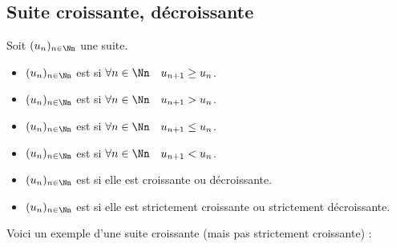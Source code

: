 \documentclass[class=report,crop=false]{standalone}
\begin{document}
\subsection{Suite croissante, décroissante}
\begin{definition}
Soit $(u_n)_{n\in \Nn}$ une suite.
\begin{itemize}
  \item $(u_n)_{n\in \Nn}$ est  si \quad $\forall n\in \Nn \quad u_{n+1} \ge u_n $.
  \item $(u_n)_{n\in \Nn}$ est  si \quad $\forall n\in \Nn \quad u_{n+1} > u_n$.
  \item $(u_n)_{n\in \Nn}$ est  si \quad $\forall n\in \Nn \quad u_{n+1} \le u_n$.
  \item $(u_n)_{n\in \Nn}$ est  si \quad $\forall n\in \Nn \quad u_{n+1} < u_n$.
    \item $(u_n)_{n\in \Nn}$ est  si elle est croissante ou décroissante.
      \item $(u_n)_{n\in \Nn}$ est 
si elle est strictement croissante ou strictement décroissante.
  \end{itemize}
\end{definition}


Voici un exemple d'une suite croissante (mais pas strictement croissante) :
\end{document}

